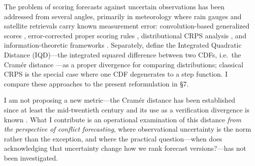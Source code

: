 The problem of scoring forecasts against uncertain observations has been addressed from several angles, primarily in meteorology where rain gauges and satellite retrievals carry known measurement error: convolution-based generalized scores \citep{brocker2007scoring}, error-corrected proper scoring rules \citep{ferro2017observation}, distributional CRPS analysis \citep{bessac2021forecast,bolin2023local}, and information-theoretic frameworks \citep{weijs2011accounting}. Separately, \citet{thorarinsdottir2013using} define the Integrated Quadratic Distance (IQD)---the integrated squared difference between two CDFs, i.e.\ the Cram\'er distance \citep{cramer1946}---as a proper divergence for comparing distributions; classical CRPS is the special case where one CDF degenerates to a step function. I compare these approaches to the present reformulation in \S7.

I am not proposing a new metric---the Cram\'er distance has been established since at least the mid-twentieth century \citep{cramer1946} and its use as a verification divergence is known \citep{thorarinsdottir2013using,szekely2013energy}. What I contribute is an operational examination of this distance \emph{from the perspective of conflict forecasting}, where observational uncertainty is the norm rather than the exception, and where the practical question---when does acknowledging that uncertainty change how we rank forecast versions?---has not been investigated.

